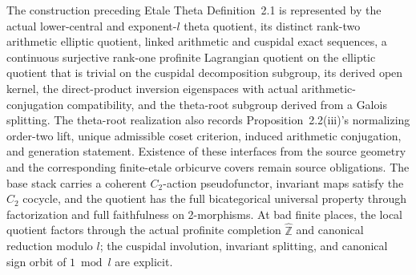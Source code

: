 \begin{definition}
  \label{def:etale-theta-quotient-input}
  \leanok
  The construction preceding Etale Theta Definition~2.1 is represented by the
  actual lower-central and exponent-\(l\) theta quotient, its distinct
  rank-two arithmetic elliptic quotient, linked arithmetic and cuspidal exact
  sequences, a continuous surjective rank-one profinite Lagrangian quotient
  on the elliptic quotient that is trivial on the cuspidal decomposition
  subgroup, its derived open kernel, the direct-product inversion eigenspaces
  with actual arithmetic-conjugation compatibility, and the theta-root
  subgroup derived from a Galois splitting.  The theta-root realization also
  records Proposition~2.2(iii)'s normalizing order-two lift, unique admissible
  coset criterion, induced arithmetic conjugation, and generation statement.
  Existence of these interfaces from the source geometry and the
  corresponding finite-etale orbicurve covers remain source obligations.  The
  base stack carries a coherent \(C_2\)-action pseudofunctor, invariant maps
  satisfy the \(C_2\) cocycle, and the quotient has the full bicategorical
  universal property through factorization and full faithfulness on
  2-morphisms.  At bad
  finite places, the local quotient factors through the actual profinite
  completion \(\widehat{\mathbb Z}\) and canonical reduction modulo \(l\);
  the cuspidal involution, invariant splitting, and canonical sign orbit of
  \(1\bmod l\) are explicit.
\end{definition}

